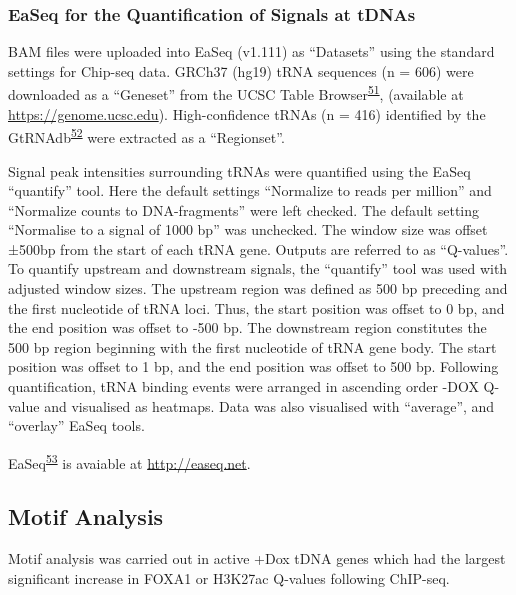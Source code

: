 \documentclass[
  11pt,
]{article}
\begin{document}
\hypertarget{easeq-for-the-quantification-of-signals-at-tdnas}{%
\subsubsection{EaSeq for the Quantification of Signals at tDNAs}\label{easeq-for-the-quantification-of-signals-at-tdnas}}

BAM files were uploaded into EaSeq (v1.111) as ``Datasets'' using the standard settings for Chip-seq data.
GRCh37 (hg19) tRNA sequences (n = 606) were downloaded as a ``Geneset'' from the UCSC Table Browser\textsuperscript{\protect\hyperlink{ref-Karolchik2004}{51}}, (available at \url{https://genome.ucsc.edu}).
High-confidence tRNAs (n = 416) identified by the GtRNAdb\textsuperscript{\protect\hyperlink{ref-Chan2016}{52}} were extracted as a ``Regionset''.

Signal peak intensities surrounding tRNAs were quantified using the EaSeq ``quantify'' tool.
Here the default settings ``Normalize to reads per million'' and ``Normalize counts to DNA-fragments'' were left checked.
The default setting ``Normalise to a signal of 1000 bp'' was unchecked.
The window size was offset ±500bp from the start of each tRNA gene.
Outputs are referred to as ``Q-values''.
To quantify upstream and downstream signals, the ``quantify'' tool was used with adjusted window sizes.
The upstream region was defined as 500 bp preceding and the first nucleotide of tRNA loci.
Thus, the start position was offset to 0 bp, and the end position was offset to -500 bp.
The downstream region constitutes the 500 bp region beginning with the first nucleotide of tRNA gene body.
The start position was offset to 1 bp, and the end position was offset to 500 bp.
Following quantification, tRNA binding events were arranged in ascending order -DOX Q-value and visualised as heatmaps.
Data was also visualised with ``average'', and ``overlay'' EaSeq tools.

EaSeq\textsuperscript{\protect\hyperlink{ref-lerdrup2016}{53}} is avaiable at \url{http://easeq.net}.

\hypertarget{motif-analysis}{%
\subsection{Motif Analysis}\label{motif-analysis}}

Motif analysis was carried out in active +Dox tDNA genes which had the largest significant increase in FOXA1 or H3K27ac Q-values following ChIP-seq.
\end{document}
